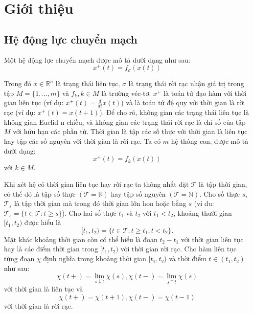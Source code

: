 \documentclass[14pt,a4paper,oneside]{report}		%
\begin{document}
\chapter{Giới thiệu}
\section{Hệ động lực chuyển mạch}
Một hệ động lực chuyển mạch được mô tả dưới dạng như sau:
\begin{equation} \label{eq1}
x^+(t) = f_\sigma(x(t))
\end{equation}

Trong đó $x\in\mathbb{R}^n$ là trạng thái liên tục, $\sigma$ là trạng thái rời rạc nhận giá trị trong tập $M = \{1,...,m\}$ và $f_k, k\in M$ là trường véc-tơ. $x^+$ là toán tử đạo hàm với thời gian liên tục (ví dụ: $x^+(t)=\frac{d}{dt}x(t)$) và là toán tử đệ quy với thời gian là rời rạc (ví dụ: $x^+(t)=x(t+1)$).
Để cho rõ, không gian các trạng thái liên tục là không gian Euclid n-chiều, và không gian các trạng thái rời rạc là chỉ số của tập $M$ với hữu hạn các phần tử. Thời gian là tập các số thực với thời gian là liên tục hay tập các số nguyên với thời gian là rời rạc.
Ta có $m$ hệ thông con, được mô tả dưới dạng:
\begin{equation} \label{eq2}
x^+(t) = f_k(x(t))
\end{equation}
với $k\in M$.

Khi xét hệ có thời gian liên tục hay rời rạc ta thông nhất đặt $\mathcal{T}$ là tập thời gian, có thể đó là tập số thực $(\mathcal{T} = \mathbb{R})$ hay tập số nguyên $(\mathcal{T} = \mathbb{N})$. Cho số thực $s$, $\mathcal{T}_s$ là tập thời gian mà trong đó thời gian lớn hon hoặc bằng $s$ (ví du: $\mathcal{T}_s=\{t\in\mathcal{T} : t\geq s\}$). Cho hai số thực $t_1$ và $t_2$ với $t_1 < t_2$, khoảng thười gian $[t_1, t_2)$ được hiểu là
$$[t_1, t_2)=\{t\in\mathcal{T}: t\geq t_1, t<t_2\}.$$
Mặt khác khoảng thời gian còn có thể hiểu là đoạn $t_2 - t_1$ với thời gian liên tục hay là các điểm thời gian trong $[t_1,t_2)$ với thời gian rời rạc. Cho hàm liên tục từng đoạn $\chi$ định nghĩa trong khoảng thời gian $[t_1,t_2)$ và thời điểm $t \in (t_1,t_2)$ như sau:
$$\chi(t+)=\lim_{s\downarrow t}\chi(s), \chi(t-)=\lim_{s\uparrow t}\chi(s)$$
với thời gian là liên tục và
$$\chi(t+)=\chi(t+1), \chi(t-)=\chi(t-1)$$
với thời gian là rời rạc.
\end{document}
